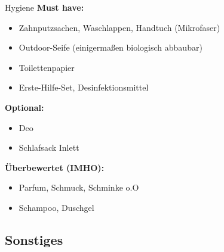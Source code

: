 \documentclass[aspectratio=169]{beamer}
\begin{document}
			\begin{frame}{Hygiene}
				\textbf{Must have:}
				\begin{itemize}
					\item Zahnputzsachen, Waschlappen, Handtuch (Mikrofaser)
					\item Outdoor-Seife (einigermaßen biologisch abbaubar)
					\item Toilettenpapier
					\item Erste-Hilfe-Set, Desinfektionsmittel
				\end{itemize}\pause
				\textbf{Optional:}
				\begin{itemize}
					\item Deo
					\item Schlafsack Inlett
				\end{itemize}\pause
				\textbf{Überbewertet (IMHO):}
				\begin{itemize}
					\item Parfum, Schmuck, Schminke o.O
					\item Schampoo, Duschgel
				\end{itemize}
			\end{frame}
			
		\subsection{Sonstiges}
			
\end{document}

